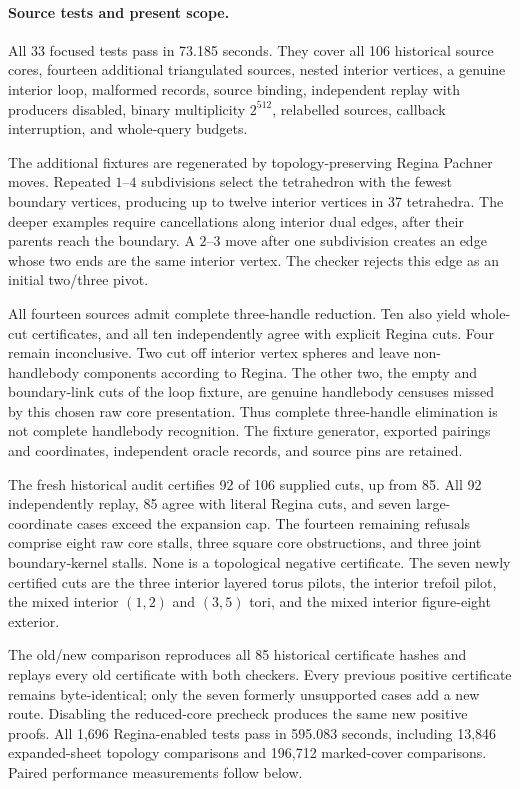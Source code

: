 \paragraph{Source tests and present scope.}
All 33 focused tests pass in 73.185 seconds. They cover all 106 historical
source cores, fourteen additional triangulated sources, nested interior
vertices, a genuine interior loop, malformed records, source binding,
independent replay with producers disabled, binary multiplicity $2^{512}$,
relabelled sources, callback interruption, and whole-query budgets.

The additional fixtures are regenerated by topology-preserving Regina
Pachner moves. Repeated $1$--$4$ subdivisions select the tetrahedron with the
fewest boundary vertices, producing up to twelve interior vertices in 37
tetrahedra. The deeper examples require cancellations along interior dual
edges, after their parents reach the boundary. A $2$--$3$ move after one
subdivision creates an edge whose two ends are the same interior vertex.
The checker rejects this edge as an initial two/three pivot.

All fourteen sources admit complete three-handle reduction. Ten also yield
whole-cut certificates, and all ten independently agree with explicit
Regina cuts. Four remain inconclusive. Two cut off interior vertex spheres
and leave non-handlebody components according to Regina. The other two,
the empty and boundary-link cuts of the loop fixture, are genuine
handlebody censuses missed by this chosen raw core presentation. Thus
complete three-handle elimination is not complete handlebody recognition.
The fixture generator, exported pairings and coordinates, independent
oracle records, and source pins are retained.

The fresh historical audit certifies 92 of 106 supplied cuts, up from 85.
All 92 independently replay, 85 agree with literal Regina cuts, and seven
large-coordinate cases exceed the expansion cap. The fourteen remaining
refusals comprise eight raw core stalls, three square core obstructions,
and three joint boundary-kernel stalls. None is a topological negative
certificate. The seven newly certified cuts are the three interior layered
torus pilots, the interior trefoil pilot, the mixed interior $(1,2)$ and
$(3,5)$ tori, and the mixed interior figure-eight exterior.

The old/new comparison reproduces all 85 historical certificate hashes and
replays every old certificate with both checkers. Every previous positive
certificate remains byte-identical; only the seven formerly unsupported
cases add a new route. Disabling the reduced-core precheck produces the same
new positive proofs. All 1,696 Regina-enabled tests pass in 595.083 seconds,
including 13,846 expanded-sheet topology comparisons and 196,712
marked-cover comparisons. Paired performance measurements follow below.


